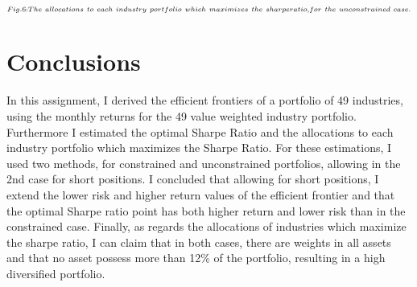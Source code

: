 \documentclass{article}
\begin{document}
$\overset{%
Fig.6:The~allocations~to~each~industry~portfolio~which~maximizes~the~sharperatio,for~the~unconstrained~case.%
}{\ \ \ \ \ \ \ \ \ \ \ \ \ \ \ \ \ \ \ \ \ \ \ \ \ \ \ \ \ \ \ \ \ \ \ \ \
\ \ \ \ \ \ \ \ \ \ \ \ \ \ \ \ \ \ \ \ \ \ \ \ \ \ \ \ \ \ \ \ \ \ \ \ \ \
\ \ \ \ \ \ \ \ \ \ \ \ \ \ \ \ \ \ \ \ \ \ \ \ }$

\bigskip

\section{Conclusions}

In this assignment, I derived the efficient frontiers of a portfolio of 49
industries, using the monthly returns for the 49 value weighted industry
portfolio. Furthermore I estimated the optimal Sharpe Ratio and the
allocations to each industry portfolio which maximizes the Sharpe Ratio. For
these estimations, I used two methods, for constrained and unconstrained
portfolios, allowing in the 2nd case for short positions. I concluded that
allowing for short positions, I extend the lower risk and higher return
values of the efficient frontier and that the optimal Sharpe ratio point has
both higher return and lower risk than in the constrained case. Finally, as
regards the allocations of industries which maximize the sharpe ratio, I can
claim that in both cases, there are weights in all assets and that no asset
possess more than 12\% of the portfolio, resulting in a high diversified
portfolio.
\end{document}
